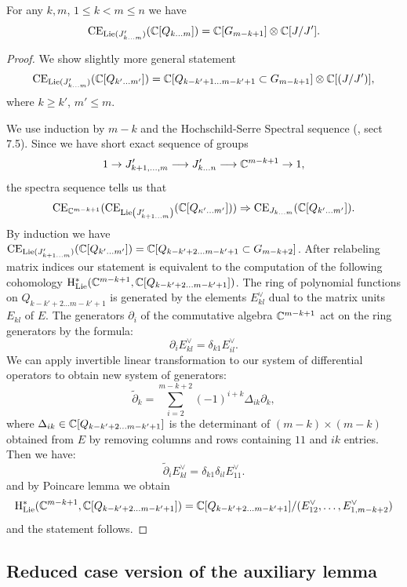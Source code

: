 \begin{proposition}\label{prop: Lie cohs} For any $k,m$, $1\le k<m\le n$ we have
$$\mathrm{CE}_{\mathrm{Lie}(J'_{k\dots m})}(\mathbb{C}[Q_{k\dots m}])=\mathbb{C}[G_{m-k+1}]\otimes \mathbb{C}[J/J'].$$
\end{proposition}
\begin{proof}
We show slightly more general statement
$$\mathrm{CE}_{\mathrm{Lie}(J'_{k\dots m})}(\mathbb{C}[Q_{k'\dots m'}])=
\mathbb{C}[Q_{k-k'+1\dots m-k'+1}\subset G_{m-k+1}]\otimes \mathbb{C}[(J/J')],$$
where $k\ge k'$, $m'\le m$.

We use induction by $m-k$ and the Hochschild-Serre Spectral sequence (\cite{Wei}, sect 7.5). Since we have short exact sequence of groups
$$ 1\to J'_{k+1,\dots, m}\longrightarrow J'_{k\dots n}\longrightarrow \mathbb{C}^{m-k+1}\to 1,$$
the spectra sequence tells us that
$$\mathrm{CE}_{\mathbb{C}^{m-k+1}}(\mathrm{CE}_{\mathrm{Lie}\left(J'_{k+1\dots m}\right)}(\mathbb{C}[Q_{\kappa'\dots m'}]))\Rightarrow \mathrm{CE}_{J_{k\dots m}}(\mathbb{C}[Q_{k'\dots m'}]).$$
By induction we have
$\mathrm{CE}_{\mathrm{Lie}(J'_{k+1\dots m})}(\mathbb{C}[Q_{k'\dots m'}])=\mathbb{C}[Q_{k-k'+2\dots m-k'+1}\subset G_{m-k+2}]$.
After relabeling matrix indices our statement is equivalent to the computation of the  following cohomology
$\mathrm{H}^*_{\mathrm{Lie}}(\mathbb{C}^{m-k+1},\mathbb{C}[Q_{k-k'+2\dots m-k'+1}])$. The ring
of polynomial functions on $Q_{k-k'+2\dots m-k'+1}$ is generated by the
elements $E_{kl}^\vee$    %
dual to the matrix units $E_{kl}$ of $E$. The generators
$\partial_i$ of the commutative algebra $\mathbb{C}^{m-k+1}$ act on the ring generators by the formula:
$$\partial_i E^\vee_{kl}=\delta_{k1} E_{il}^\vee.$$
We can apply invertible linear transformation to our system of differential operators to obtain new system of generators:
$$\tilde{\partial}_k=\sum_{i=2}^{m-k+2} (-1)^{i+k}\Delta_{ik}\partial_k,$$
where $\Delta_{ik}\in \mathbb{C}[Q_{k-k'+2\dots m-k'+1}]$ is the determinant of $(m-k)\times (m-k)$ obtained from $E$ by removing columns and rows containing $11$ and $ik$ entries.
Then  we have:
$$\tilde{\partial}_i E^\vee_{kl}=\delta_{k1}\delta_{il} E_{11}^\vee.$$
and by Poincare lemma we obtain
$$\mathrm{H}^*_{\mathrm{Lie}}(\mathbb{C}^{m-k+1},\mathbb{C}[Q_{k-k'+2\dots m-k'+1}])=\mathbb{C}[Q_{k-k'+2\dots m-k'+1}]/(E_{12}^\vee,\dots,E_{1,m-k+2}^\vee)$$ and the
statement follows.
\end{proof}


\subsection{Reduced case version of the auxiliary lemma }


